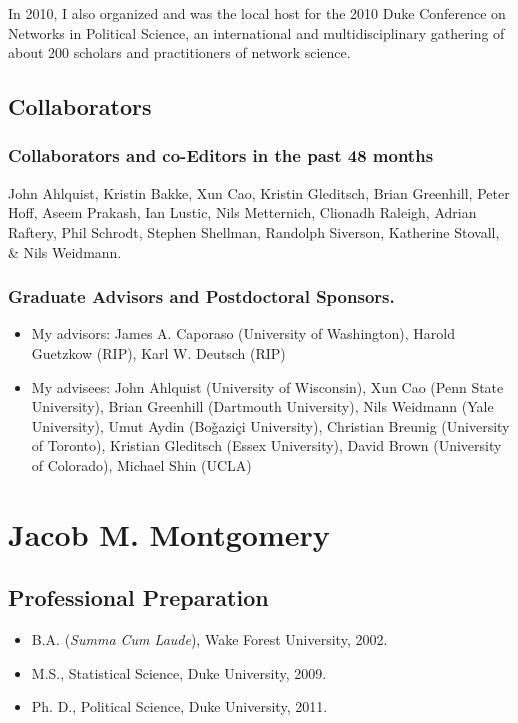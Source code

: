 \documentclass[pdftex,12pt,fullpage,oneside]{amsart}
\begin{document}
In 2010, I also organized and was the local host for the 2010 Duke
Conference on Networks in Political Science, an international and
multidisciplinary gathering of about 200 scholars and practitioners of
network science.


\subsection*{Collaborators}

\subsubsection*{Collaborators and co-Editors in the past 48 months}
John Ahlquist, Kristin Bakke, Xun Cao, Kristin Gleditsch, Brian
Greenhill, Peter Hoff, Aseem Prakash, Ian Lustic, Nils Metternich,
Clionadh Raleigh, Adrian Raftery, Phil Schrodt, Stephen Shellman,
Randolph Siverson, Katherine Stovall, \& Nils Weidmann.
\subsubsection*{Graduate Advisors and Postdoctoral Sponsors.}
\begin{itemize}
\item[] My advisors: James A. Caporaso (University of Washington),
  Harold Guetzkow (RIP), Karl W. Deutsch (RIP)
\item[] My advisees: John Ahlquist (University of Wisconsin), Xun Cao
  (Penn State University), Brian Greenhill (Dartmouth University),
  Nils Weidmann (Yale University), Umut Aydin (Bo\v{g}azi\c{c}i
  University), Christian Breunig (University of Toronto), Kristian
  Gleditsch (Essex University), David Brown (University of Colorado),
  Michael Shin (UCLA)
\end{itemize}

\newpage


\newpage
\setcounter{page}{1}
\thispagestyle{empty}

\section*{Jacob M. Montgomery}
\subsection*{Professional Preparation}
\begin{itemize}
\item[]B.A. (\textit{Summa Cum Laude}), Wake Forest University, 2002.
\item[]M.S., Statistical Science, Duke University, 2009. 
\item[]Ph. D., Political Science, Duke University, 2011. 
\end{itemize}
\end{document}
